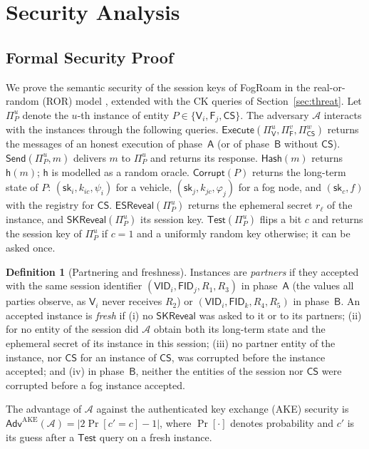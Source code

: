 \documentclass[journal]{IEEEtran}
\theoremstyle{plain}
\theoremstyle{definition}
\newtheorem{definition}{Definition}
\newcommand{\Veh}{\mathsf{V}}            %
\newcommand{\Fog}{\mathsf{F}}            %
\newcommand{\CS}{\mathsf{CS}}            %
\newcommand{\Adv}{\mathcal{A}}           %
\newcommand{\VID}{\mathsf{VID}}          %
\newcommand{\FID}{\mathsf{FID}}          %
\newcommand{\h}{\mathsf{h}}              %
\newcommand{\sk}{\mathsf{sk}}            %
\newcommand{\Ex}{\mathsf{Execute}}
\newcommand{\Snd}{\mathsf{Send}}
\newcommand{\Hq}{\mathsf{Hash}}
\newcommand{\Cor}{\mathsf{Corrupt}}
\newcommand{\ESR}{\mathsf{ESReveal}}
\newcommand{\SKR}{\mathsf{SKReveal}}
\newcommand{\Tst}{\mathsf{Test}}
\newcommand{\protocol}{\textsf{FogRoam}}   %
\begin{document}
\section{Security Analysis}\label{sec:security}

\subsection{Formal Security Proof}\label{sec:ror}
We prove the semantic security of the session keys of {\protocol} in the real-or-random (ROR) model \cite{abdalla2005password}, extended with the CK queries of Section~\ref{sec:threat}. Let $\Pi^u_P$ denote the $u$-th instance of entity $P\in\{\Veh_i,\Fog_j,\CS\}$. The adversary $\Adv$ interacts with the instances through the following queries.
$\Ex(\Pi^u_{\Veh},\Pi^v_{\Fog},\Pi^w_{\CS})$ returns the messages of an honest execution of phase~$\mathsf{A}$ (or of phase~$\mathsf{B}$ without $\CS$).
$\Snd(\Pi^u_P,m)$ delivers $m$ to $\Pi^u_P$ and returns its response.
$\Hq(m)$ returns $\h(m)$; $\h$ is modelled as a random oracle.
$\Cor(P)$ returns the long-term state of $P$: $(\sk_i,k_{ic},\psi_i)$ for a vehicle, $(\sk_j,k_{jc},\varphi_j)$ for a fog node, and $(\sk_c,f)$ with the registry for $\CS$.
$\ESR(\Pi^u_P)$ returns the ephemeral secret $r_\ell$ of the instance, and $\SKR(\Pi^u_P)$ its session key.
$\Tst(\Pi^u_P)$ flips a bit $c$ and returns the session key of $\Pi^u_P$ if $c=1$ and a uniformly random key otherwise; it can be asked once.

\begin{definition}[Partnering and freshness]
Instances are \emph{partners} if they accepted with the same session identifier $(\VID_i,\FID_j,R_1,R_3)$ in phase~$\mathsf{A}$ (the values all parties observe, as $\Veh_i$ never receives $R_2$) or $(\VID_i,\FID_k,R_4,R_5)$ in phase~$\mathsf{B}$. An accepted instance is \emph{fresh} if (i) no $\SKR$ was asked to it or to its partners; (ii) for no entity of the session did $\Adv$ obtain both its long-term state and the ephemeral secret of its instance in this session; (iii) no partner entity of the instance, nor $\CS$ for an instance of $\CS$, was corrupted before the instance accepted; and (iv) in phase~$\mathsf{B}$, neither the entities of the session nor $\CS$ were corrupted before a fog instance accepted.
\end{definition}

The advantage of $\Adv$ against the authenticated key exchange (AKE) security is $\mathsf{Adv}^{\mathrm{AKE}}(\Adv)=|2\Pr[c'=c]-1|$, where $\Pr[\cdot]$ denotes probability and $c'$ is its guess after a $\Tst$ query on a fresh instance.
\end{document}
